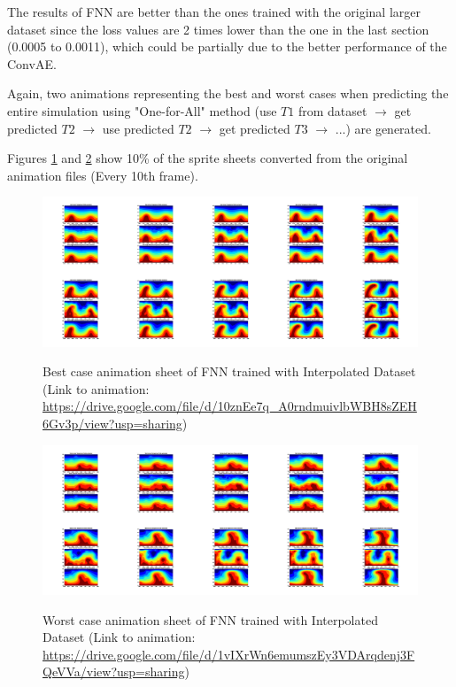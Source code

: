 The results of FNN are better than the ones trained with the original larger dataset since the loss values are 2 times lower than the one in the last section (0.0005 to 0.0011), which could be partially due to the better performance of the ConvAE.

Again, two animations representing the best and worst cases when predicting the entire simulation using "One-for-All" method (use $T1$ from dataset $\rightarrow$ get predicted $T2$ $\rightarrow$ use predicted $T2$ $\rightarrow$ get predicted $T3$ $\rightarrow$ ...) are generated.

Figures \ref{figure:FNN_interpolated_best_gif} and \ref{figure:FNN_interpolated_worst_gif} show 10\% of the sprite sheets converted from the original animation files (Every 10th frame).

\begin{figure}[H]
    \centering
    \caption{Best case animation sheet of FNN trained with Interpolated Dataset (Link to animation: \url{https://drive.google.com/file/d/10znEe7q_A0rndmuivlbWBH8sZEH6Gv3p/view?usp=sharing})}
    \includegraphics[scale=0.10]{figures/mantle_convection_images/larger_dataset_interpolated/FNN_Best_GIF_sheet.png}
    \label{figure:FNN_interpolated_best_gif}
\end{figure}

\begin{figure}[H]
    \centering
    \caption{Worst case animation sheet of FNN trained with Interpolated Dataset (Link to animation: 
    \url{https://drive.google.com/file/d/1vIXrWn6emumszEy3VDArqdenj3FQeVVa/view?usp=sharing})}
    \includegraphics[scale=0.10]{figures/mantle_convection_images/larger_dataset_interpolated/FNN_Worst_GIF_sheet.png}
    \label{figure:FNN_interpolated_worst_gif}
\end{figure}

